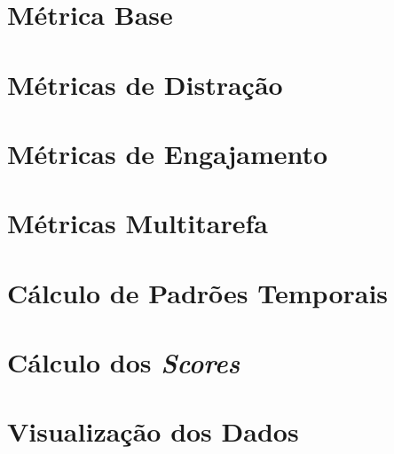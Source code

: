 \section{Métrica Base}\label{sec:espeon_base_metrics}


\section{Métricas de Distração}\label{sec:espeon_disturb_metrics}


\section{Métricas de Engajamento}\label{sec:espeon_engajement}


\section{Métricas Multitarefa}\label{sec:espeon_multitask}


\section{Cálculo de Padrões Temporais}\label{sec:espeon_tempo}


\section{Cálculo dos \textit{Scores}}\label{sec:espeon_scores}


\section{Visualização dos Dados}\label{sec:espeon_bi}
